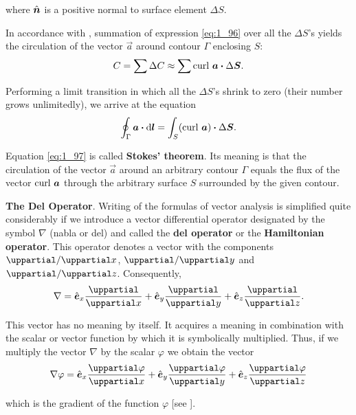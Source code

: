 \noindent
where $\hat{\boldsymbol{n}}$ is a positive normal to surface element $\Delta{S}$.

In accordance with , summation of expression \eqref{eq:1_96} over all the $\Delta{S}$'s yields the circulation of the vector $\vec{a}$ around contour $\Gamma$ enclosing $S$:
\begin{equation*}
	C = \sum\Delta{C} \approx \sum\text{curl~}\boldsymbol{a} \boldsymbol{\cdot} \Delta{\boldsymbol{S}}.
\end{equation*}

\noindent
Performing a limit transition in which all the $\Delta{S}$'s shrink to zero (their number grows unlimitedly), we arrive at the equation
\begin{equation}\label{eq:1_97}
	\oint_{\Gamma} \boldsymbol{a}\boldsymbol{\cdot}\mathrm{d}\boldsymbol{l} = \int_S (\text{curl~}\boldsymbol{a}) \boldsymbol{\cdot} \Delta{\boldsymbol{S}}.
\end{equation}

\noindent
Equation \eqref{eq:1_97} is called \textbf{Stokes' theorem}. Its meaning is that the circulation of the vector $\vec{a}$ around an arbitrary contour $\Gamma$ equals the flux of the vector $\text{curl~}\boldsymbol{a}$ through the arbitrary surface $S$ surrounded by the given contour.

\textbf{The Del Operator}. Writing of the formulas of vector analysis is simplified quite considerably if we introduce a vector differential operator designated by the symbol $\nabla$ (nabla or del) and called the \textbf{del operator} or the \textbf{Hamiltonian operator}. This operator denotes a vector with the components $\diffinpartial{}{x}$, $\diffinpartial{}{y}$ and $\diffinpartial{}{z}$. Consequently,
\vspace{-10pt}
\begin{equation}\label{eq:1_98}
	\nabla = \vecuni{x}\diffpartial{}{x} + \vecuni{y}\diffpartial{}{y} + \vecuni{z}\diffpartial{}{z}.
\end{equation}

\noindent
This vector has no meaning by itself. It acquires a meaning in combination with the scalar or vector function by which it is symbolically multiplied. Thus, if we multiply the vector $\nabla$ by the scalar $\varphi$ we obtain the vector
\begin{equation}\label{eq:1_99}
	\gradop{\varphi} = \vecuni{x}\diffpartial{\varphi}{x} + \vecuni{y}\diffpartial{\varphi}{y} + \vecuni{z}\diffpartial{\varphi}{z}
\end{equation}

\noindent
which is the gradient of the function $\varphi$ [see ].

